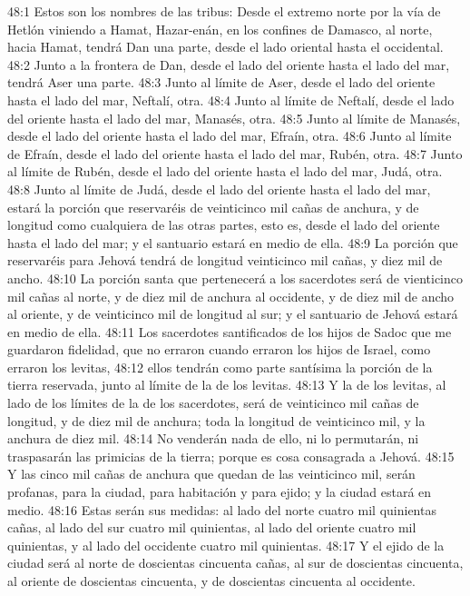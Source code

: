 48:1 Estos son los nombres de las tribus: Desde el extremo norte por la vía de Hetlón viniendo a Hamat, Hazar-enán, en los confines de Damasco, al norte, hacia Hamat, tendrá Dan una parte, desde el lado oriental hasta el occidental.   
48:2 Junto a la frontera de Dan, desde el lado del oriente hasta el lado del mar, tendrá Aser una parte.   
48:3 Junto al límite de Aser, desde el lado del oriente hasta el lado del mar, Neftalí, otra.   
48:4 Junto al límite de Neftalí, desde el lado del oriente hasta el lado del mar, Manasés, otra.   
48:5 Junto al límite de Manasés, desde el lado del oriente hasta el lado del mar, Efraín, otra.   
48:6 Junto al límite de Efraín, desde el lado del oriente hasta el lado del mar, Rubén, otra.   
48:7 Junto al límite de Rubén, desde el lado del oriente hasta el lado del mar, Judá, otra.   
48:8 Junto al límite de Judá, desde el lado del oriente hasta el lado del mar, estará la porción que reservaréis de veinticinco mil cañas   de anchura, y de longitud como cualquiera de las otras partes, esto es, desde el lado del oriente hasta el lado del mar; y el santuario estará en medio de ella.   
48:9 La porción que reservaréis para Jehová tendrá de longitud veinticinco mil cañas, y diez mil de ancho.   
48:10 La porción santa que pertenecerá a los sacerdotes será de vienticinco mil cañas   al norte, y de diez mil de anchura al occidente, y de diez mil de ancho al oriente, y de veinticinco mil de longitud al sur; y el santuario de Jehová estará en medio de ella.   
48:11 Los sacerdotes santificados de los hijos de Sadoc que me guardaron fidelidad, que no erraron cuando erraron los hijos de Israel, como erraron los levitas,   
48:12 ellos tendrán como parte santísima la porción de la tierra reservada, junto al límite de la de los levitas.   
48:13 Y la de los levitas, al lado de los límites de la de los sacerdotes, será de veinticinco mil cañas   de longitud, y de diez mil de anchura; toda la longitud de veinticinco mil, y la anchura de diez mil.   
48:14 No venderán nada de ello, ni lo permutarán, ni traspasarán las primicias de la tierra; porque es cosa consagrada a Jehová.   
48:15 Y las cinco mil cañas   de anchura que quedan de las veinticinco mil, serán profanas, para la ciudad, para habitación y para ejido; y la ciudad estará en medio.   
48:16 Estas serán sus medidas: al lado del norte cuatro mil quinientas cañas, al lado del sur cuatro mil quinientas, al lado del oriente cuatro mil quinientas, y al lado del occidente cuatro mil quinientas.   
48:17 Y el ejido de la ciudad será al norte de doscientas cincuenta cañas, al sur de doscientas cincuenta, al oriente de doscientas cincuenta, y de doscientas cincuenta al occidente. 
